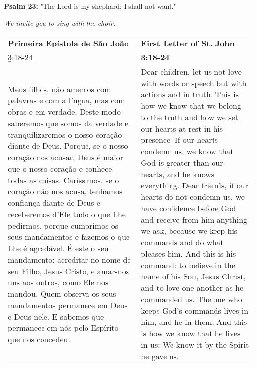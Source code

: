 \vspace{10pt}

{\bf Psalm 23:} "The Lord is my shephard; I shall not want."

{\it We invite you to sing with the choir.}


\begin{longtable}{p{1.7in}p{1.7in}}
  {\bf Primeira Epístola de São João} & \hfill{\bf First Letter of St. John}\\
  {\b3:18-24}&\hfill{\bf 3:18-24}\\
Meus filhos,
não amemos com palavras e com a língua,
mas com obras e em verdade.
Deste modo saberemos que somos da verdade
e tranquilizaremos o nosso coração diante de Deus.
Porque, se o nosso coração nos acusar,
Deus é maior que o nosso coração
e conhece todas as coisas.
Caríssimos, se o coração não nos acusa,
tenhamos confiança diante de Deus
e receberemos d’Ele tudo o que Lhe pedirmos,
porque cumprimos os seus mandamentos
e fazemos o que Lhe é agradável.
É este o seu mandamento:
acreditar no nome de seu Filho, Jesus Cristo,
e amar-nos uns aos outros, como Ele nos mandou.
Quem observa os seus mandamentos
permanece em Deus e Deus nele.
E sabemos que permanece em nós
pelo Espírito que nos concedeu.
&
Dear children, let us not love with words or speech but with actions and in truth.
This is how we know that we belong to the truth and how we set our hearts at rest in his presence: If our hearts condemn us, we know that God is greater than our hearts, and he knows everything. Dear friends, if our hearts do not condemn us, we have confidence before God and receive from him anything we ask, because we keep his commands and do what pleases him. And this is his command: to believe in the name of his Son, Jesus Christ, and to love one another as he commanded us. The one who keeps God’s commands lives in him, and he in them. And this is how we know that he lives in us: We know it by the Spirit he gave us.
\end{longtable}

\newpage


